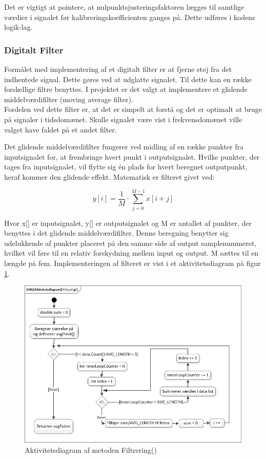 Det er vigtigt at pointere, at nulpunktsjusteringsfaktoren lægges til samtlige værdier i signalet før kalibreringskoefficienten ganges på. Dette udføres i kodens logik-lag.
 
\subsubsection{Digitalt Filter}
\cite{DSBsoft} Formålet med implementering af et digitalt filter er at fjerne støj fra det indhentede signal. Dette gøres ved at udglatte signalet. Til dette kan en række forskellige filtre benyttes. I projektet er det valgt at implementere et glidende middelværdifilter (moving average filter).\\ Fordelen ved dette filter er, at det er simpelt at forstå og det er optimalt at bruge på signaler i tidsdomænet. Skulle signalet være vist i frekvensdomænet ville valget have faldet på et andet filter. 

Det glidende middelværdifilter fungerer ved midling af en række punkter fra inputsignalet for, at frembringe hvert punkt i outputsignalet. Hvilke punkter, der tages fra inputsignalet, vil flytte sig én plads for hvert beregnet outputpunkt, heraf kommer den glidende effekt. Matematisk er filteret givet ved:
\begin{ceqn}
\begin{equation}
y[i]=\frac{1}{M}\cdot\sum\limits_{j=0}^{M-1} x[i+j]
\end{equation}
\end{ceqn}

Hvor x[] er inputsignalet, y[] er outputsignalet og M er antallet af punkter, der benyttes i det glidende middelværdifilter. Denne beregning benytter sig udelukkende af punkter placeret på den samme side af output samplenummeret, hvilket vil føre til en relativ forskydning mellem input og output. M sættes til en længde på fem. Implementeringen af filteret er vist i et aktivitetsdiagram på figur \ref{fig:Aktivitetsdiagram_Digitalt_filter}.

\begin{figure}[H]
	\centering
	\includegraphics[width=1.0\textwidth]{Figurer/AktFiltrering}
	\caption{Aktivitetsdiagram af metoden Filtrering()}
	\label{fig:Aktivitetsdiagram_Digitalt_filter}
\end{figure}

